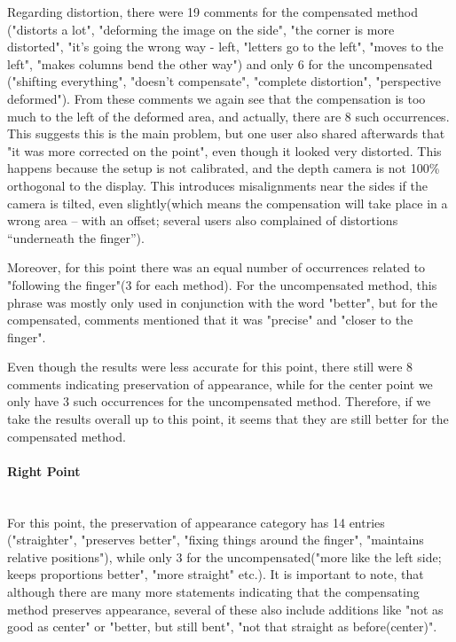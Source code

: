 \documentclass[]{article}
\begin{document}
Regarding distortion, there were 19 comments for the compensated method ("distorts a lot", "deforming the image on the side", "the corner is more distorted", "it's going the wrong way - left, "letters go to the left", "moves to the left", "makes columns bend the other way") and only 6 for the uncompensated ("shifting everything", "doesn't compensate", "complete distortion", "perspective deformed"). From these comments we again see that the compensation is too much to the left of the deformed area, and actually, there are 8 such occurrences. This suggests this is the main problem, but one user also shared afterwards that "it was more corrected on the point", even though it looked very distorted. This happens because the setup is not calibrated, and the depth camera is not 100\% orthogonal to the display. This introduces misalignments near the sides if the camera is tilted, even slightly(which means the compensation will take place in a wrong area – with an offset; several users also complained of distortions “underneath the finger”).

Moreover, for this point there was an equal number of occurrences related to "following the finger"(3 for each method). For the uncompensated method, this phrase was mostly only used in conjunction with the word "better", but for the compensated, comments mentioned that it was "precise" and "closer to the finger". 

Even though the results were less accurate for this point, there still were 8 comments indicating preservation of appearance, while for the center point we only have 3 such occurrences for the uncompensated method. Therefore, if we take the results overall up to this point, it seems that they are still better for the compensated method.


\paragraph{Right Point}\mbox{}\\

For this point, the preservation of appearance category has 14 entries\\("straighter", "preserves better", "fixing things around the finger", "maintains relative positions"), while only 3 for the uncompensated("more like the left side; keeps proportions better", "more straight" etc.). It is important to note, that although there are many more statements indicating that the compensating method preserves appearance, several of these also include additions like "not as good as center" or "better, but still bent", "not that straight as before(center)".
\end{document}
